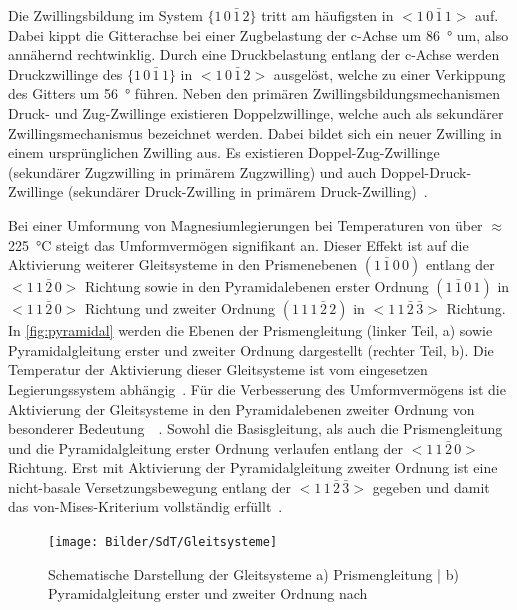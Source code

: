 Die Zwillingsbildung im System $\{1\,0\,\bar{1}\,2\}$ tritt am häufigsten in $<1\,0\,\bar{1}\,1>$ auf.
Dabei kippt die Gitterachse bei einer Zugbelastung der c-Achse um \SI{86}{\degree} um, also annähernd rechtwinklig.
Durch eine Druckbelastung entlang der c-Achse werden Druckzwillinge des $\{1\,0\,\bar{1}\,1\}$ in $<1\,0\,\bar{1}\,2>$ ausgelöst, welche zu einer Verkippung des Gitters um \SI{56}{\degree} führen.
Neben den primären Zwillingsbildungsmechanismen Druck- und Zug-Zwillinge existieren Doppelzwillinge, welche auch als sekundärer Zwillingsmechanismus bezeichnet werden.
Dabei bildet sich ein neuer Zwilling in einem ursprünglichen Zwilling aus.
Es existieren Doppel-Zug-Zwillinge (sekundärer Zugzwilling in primärem Zugzwilling) und auch Doppel-Druck-Zwillinge (sekundärer Druck-Zwilling in primärem Druck-Zwilling)~\cite{Ullmann2014}.

Bei einer Umformung von Magnesiumlegierungen bei Temperaturen von über $\approx$ \SI{225}{\degreeCelsius} steigt das Umformvermögen signifikant an.
Dieser Effekt ist auf die Aktivierung weiterer Gleitsysteme in den Prismenebenen $(1\,\bar{1}\,0\,0)$ entlang der $<1\,1\,\bar{2}\,0>$ Richtung sowie in den Pyramidalebenen erster Ordnung $(1\,\bar{1}\,0\,1)$ in $<1\,1\,\bar{2}\,0>$ Richtung und zweiter Ordnung $(1\,1\,1\,\bar{2}\,2)$ in $<1\,1\,\bar{2}\,\bar{3}>$ Richtung.
In \autoref{fig:pyramidal} werden die Ebenen der Prismengleitung (linker Teil, a) sowie Pyramidalgleitung erster und zweiter Ordnung dargestellt (rechter Teil, b).
Die Temperatur der Aktivierung dieser Gleitsysteme ist vom eingesetzen Legierungssystem abhängig~\cite{Kammer2000}.
Für die Verbesserung des Umformvermögens ist die Aktivierung der Gleitsysteme in den Pyramidalebenen zweiter Ordnung von besonderer Bedeutung~\cite{Enss2001,Doege2010}~.
Sowohl die Basisgleitung, als auch die Prismengleitung und die Pyramidalgleitung erster Ordnung verlaufen entlang der $<1\,1\,\bar{2}\,0>$ Richtung.
Erst mit Aktivierung der Pyramidalgleitung zweiter Ordnung ist eine nicht-basale Versetzungsbewegung entlang der $<1\,1\,\bar{2}\,\bar{3}>$ gegeben und damit das von-Mises-Kriterium vollständig erfüllt~\cite{Schmidt2011}.

\hkl[123] \hkl[-1-2-3]

\begin{figure}[H]%
    \centering
    \texttt{[image: Bilder/SdT/Gleitsysteme]}
    \caption[Gleitsysteme]{Schematische Darstellung der Gleitsysteme a) Prismengleitung | b) Pyramidalgleitung erster und zweiter Ordnung nach~\cite{Kammer2000}}
    \label{fig:pyramidal}
\end{figure}

